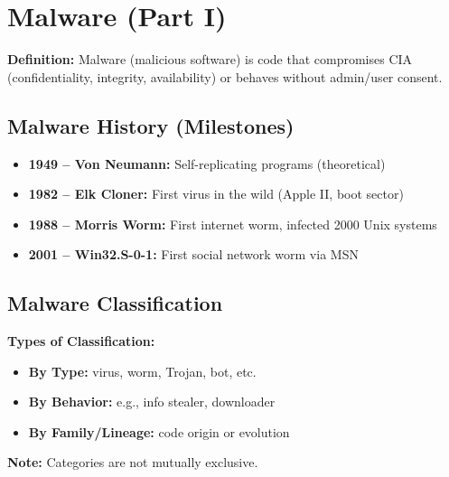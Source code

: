  \section{Malware (Part I)}

\textbf{Definition:} Malware (malicious software) is code that compromises CIA (confidentiality, integrity, availability) or behaves without admin/user consent.


\subsection{Malware History (Milestones)}
{
\begin{itemize}[noitemsep]
  \item \textbf{1949 – Von Neumann:} Self-replicating programs (theoretical)
  \item \textbf{1982 – Elk Cloner:} First virus in the wild (Apple II, boot sector)
  \item \textbf{1988 – Morris Worm:} First internet worm, infected 2000 Unix systems
  \item \textbf{2001 – Win32.S-0-1:} First social network worm via MSN
\end{itemize}
}

\subsection{Malware Classification}
{
\textbf{Types of Classification:}
\begin{itemize}[noitemsep]
  \item \textbf{By Type:} virus, worm, Trojan, bot, etc.
  \item \textbf{By Behavior:} e.g., info stealer, downloader
  \item \textbf{By Family/Lineage:} code origin or evolution
\end{itemize}

\textbf{Note:} Categories are not mutually exclusive.
}

